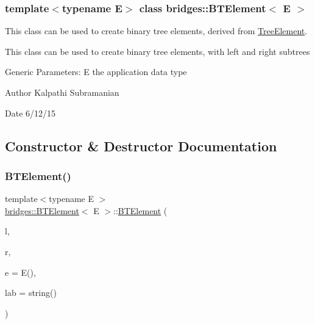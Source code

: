 \subsubsection*{template$<$typename E$>$\newline
class bridges\+::\+B\+T\+Element$<$ E $>$}

This class can be used to create binary tree elements, derived from \hyperlink{classbridges_1_1_tree_element}{Tree\+Element}. 

This class can be used to create binary tree elements, with left and right subtrees

Generic Parameters\+: E the application data type

\begin{DoxyAuthor}{Author}
Kalpathi Subramanian 
\end{DoxyAuthor}
\begin{DoxyDate}{Date}
6/12/15 
\end{DoxyDate}


\subsection{Constructor \& Destructor Documentation}
\hypertarget{classbridges_1_1_b_t_element_a8abf38e5d2d70c247de6a6fe6b90bf1b}{}\label{classbridges_1_1_b_t_element_a8abf38e5d2d70c247de6a6fe6b90bf1b} 
\subsubsection{\texorpdfstring{B\+T\+Element()}{BTElement()}\hspace{0.1cm}{\footnotesize\ttfamily [1/2]}}
{\footnotesize\ttfamily template$<$typename E $>$ \\
\hyperlink{classbridges_1_1_b_t_element}{bridges\+::\+B\+T\+Element}$<$ E $>$\+::\hyperlink{classbridges_1_1_b_t_element}{B\+T\+Element} (\begin{DoxyParamCaption}\item[{\hyperlink{classbridges_1_1_b_t_element}{B\+T\+Element}$<$ E $>$ $\ast$}]{l,  }\item[{\hyperlink{classbridges_1_1_b_t_element}{B\+T\+Element}$<$ E $>$ $\ast$}]{r,  }\item[{const E \&}]{e = {\ttfamily E()},  }\item[{const string \&}]{lab = {\ttfamily string()} }\end{DoxyParamCaption})\hspace{0.3cm}{\ttfamily [inline]}}

